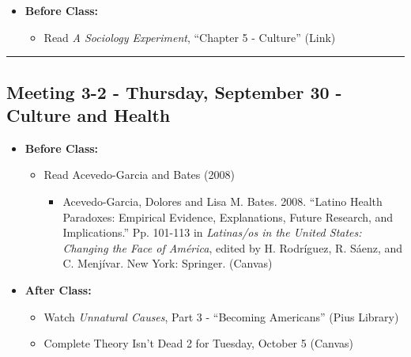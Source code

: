 \documentclass[
]{book}
\providecommand{\tightlist}{%
  \setlength{\itemsep}{0pt}\setlength{\parskip}{0pt}}
\begin{document}
\begin{itemize}
\tightlist
\item
  \textbf{Before Class:}

  \begin{itemize}
  \tightlist
  \item
    Read \emph{A Sociology Experiment}, ``Chapter 5 - Culture'' (Link)
  \end{itemize}
\end{itemize}

\begin{center}\rule{0.5\linewidth}{0.5pt}\end{center}

\hypertarget{meeting-3-2---thursday-september-30---culture-and-health}{%
\subsection*{Meeting 3-2 - Thursday, September 30 - Culture and Health}\label{meeting-3-2---thursday-september-30---culture-and-health}}

\begin{itemize}
\tightlist
\item
  \textbf{Before Class:}

  \begin{itemize}
  \tightlist
  \item
    Read Acevedo-Garcia and Bates (2008)

    \begin{itemize}
    \tightlist
    \item
      Acevedo-Garcia, Dolores and Lisa M. Bates. 2008. ``Latino Health Paradoxes: Empirical Evidence, Explanations, Future Research, and Implications.'' Pp. 101-113 in \emph{Latinas/os in the United States: Changing the Face of América}, edited by H. Rodríguez, R. Sáenz, and C. Menjívar. New York: Springer. (Canvas)
    \end{itemize}
  \end{itemize}
\item
  \textbf{After Class:}

  \begin{itemize}
  \tightlist
  \item
    Watch \emph{Unnatural Causes}, Part 3 - ``Becoming Americans'' (Pius Library)
  \item
    Complete Theory Isn't Dead 2 for Tuesday, October 5 (Canvas)
  \end{itemize}
\end{itemize}
\end{document}
